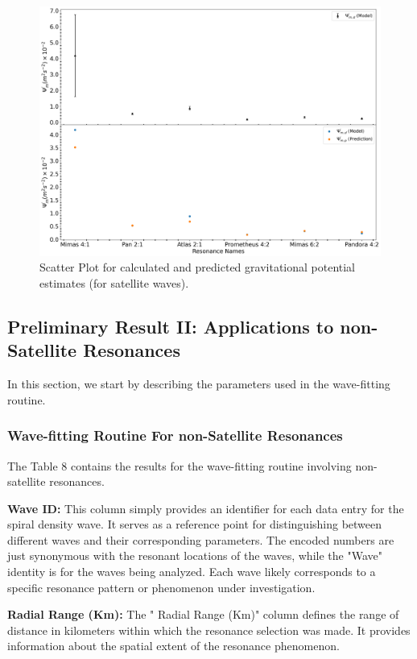 \documentclass{article}
\begin{document}
\begin{figure}
    \centering
    \includegraphics[width=0.8\linewidth]{satellitepotentialUpdated.png}
    \caption{Scatter Plot for calculated and predicted gravitational potential estimates (for satellite waves).}
    \label{fig:enter-label}
\end{figure}

\subsection{Preliminary Result II: Applications to non-Satellite Resonances}
In this section, we start by describing the parameters used in the wave-fitting routine.

\subsubsection{Wave-fitting Routine For non-Satellite Resonances}
The Table 8 contains the results for the wave-fitting routine involving non-satellite resonances.

\textbf{Wave ID:} This column simply provides an identifier for each data entry for the spiral density wave. It serves as a reference point for distinguishing between different waves and their corresponding parameters. The encoded numbers are just synonymous with the resonant locations of the waves, while the "Wave" identity is for the waves being analyzed. Each wave likely corresponds to a specific resonance pattern or phenomenon under investigation.

\textbf{Radial Range (Km):} The " Radial Range (Km)" column defines the range of distance in kilometers within which the resonance selection was made. It provides information about the spatial extent of the resonance phenomenon.
    
\end{document}
